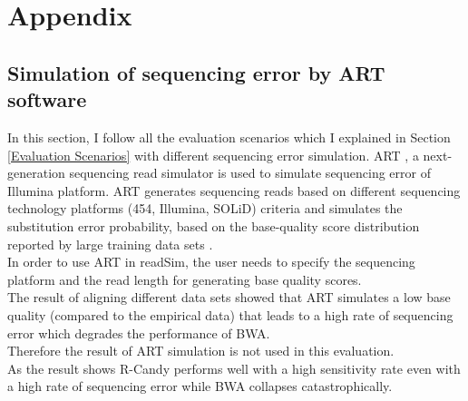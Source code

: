 \documentclass[11pt,a4paper]{report}
\begin{document}

\newpage
\appendix
\section*{Appendix}
\renewcommand{\thesubsection}{\Alph{subsection}}

\subsection{Simulation of sequencing error by ART software} 
\label{Simulation sequencing error by ART software}

In this section, I follow all the evaluation scenarios which I explained in
Section \ref{Evaluation Scenarios}  with different sequencing error simulation.
ART \cite{art}, a next-generation sequencing read simulator is used to simulate sequencing
error of Illumina platform. 
ART generates sequencing reads based on different sequencing technology 
platforms (454, Illumina, SOLiD) criteria \cite{art} and simulates the
substitution error probability, based on the base-quality 
score distribution reported by large training data sets \cite{art}.\\

In order to use ART in readSim, the user needs to specify the sequencing
platform and the read length for generating base quality scores.\\

The result of aligning different data sets showed that ART simulates a
low base quality (compared to the empirical data) that leads to 
a high rate of sequencing error which degrades the performance of BWA.\\
Therefore the result of ART simulation is not used in this evaluation. \\

As the result shows R-Candy performs well with a high sensitivity rate 
even with a high rate of sequencing error while BWA collapses catastrophically.\\
\end{document}
